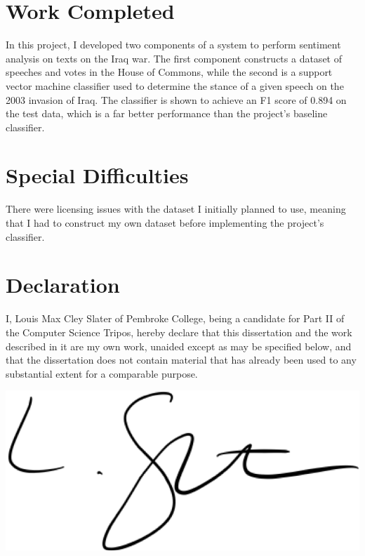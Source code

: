 \documentclass[12pt,a4paper,twoside,openright]{report}
\begin{document}
\section*{Work Completed}
In this project, I developed two components of a system to perform sentiment analysis on texts on the Iraq war. The first component constructs a dataset of speeches and votes in the House of Commons, while the second is a support vector machine classifier used to determine the stance of a given speech on the 2003 invasion of Iraq. The classifier is shown to achieve an F1 score of 0.894 on the test data, which is a far better performance than the project's baseline classifier.


\section*{Special Difficulties}
There were licensing issues with the dataset I initially planned to use, meaning that I had to construct my own dataset before implementing the project's classifier. 
\newpage

\section*{Declaration}

I, Louis Max Cley Slater of Pembroke College, being a candidate for Part II of the Computer Science Tripos, hereby declare that this dissertation and the work described in it are my own work, unaided except as may be specified below, and that the dissertation does not contain material that has already been used to any substantial extent for a comparable purpose.

\bigskip
{}
\vspace{5pt}
\includegraphics[scale=0.3]{figs/signature.png}
\vspace{5pt}
\\
\medskip
{} 
\end{document}
